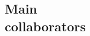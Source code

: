 \documentclass[margin,line]{resume}
\begin{document}
\begin{resume}
%




\section{\mysidestyle Main\\collaborators}


\end{resume}
\end{document}
